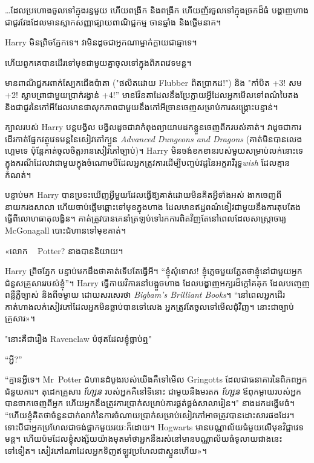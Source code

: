 …ដែលប្រហោងចូលទៅក្នុងរន្ធមួយ ហើយពង្រីក និងពង្រីក ហើយញ័រចូលទៅក្នុងច្រកដ៏ធំ បង្ហាញហាងជាជួរវែងដែលមានស្លាកសញ្ញាផ្សាយពាណិជ្ជកម្ម ចានឆ្នាំង និងថ្លើមនាគ។

Harry មិនព្រិចភ្នែកទេ។ វាមិនដូចជាអ្នកណាម្នាក់ក្លាយជាឆ្មាទេ។

ហើយពួកគេបានដើរទៅមុខជាមួយគ្នាចូលទៅក្នុងពិភពវេទមន្ត។

មានពាណិជ្ជករពាក់ស្បែកជើងប៉ាតា ("ផលិតដោយ Flubber ពិតប្រាកដ!") និង "កាំបិត +3! សម +2! ស្លាបព្រាជាមួយប្រាក់រង្វាន់ +4!” មានវ៉ែនតាដែលនឹងប្រែក្លាយអ្វីដែលអ្នកមើលទៅពណ៌បៃតង និងជាជួរនៃកៅអីដែលមានផាសុកភាពជាមួយនឹងកៅអីច្រានចេញសម្រាប់ការសង្គ្រោះបន្ទាន់។

ក្បាលរបស់ Harry បន្តបង្វិល បង្វិលដូចជាវាកំពុងព្យាយាមដកខ្លួនចេញពីករបស់គាត់។ វាដូចជាការដើរកាត់ផ្នែកវត្ថុវេទមន្តនៃសៀវភៅក្បួន \emph{Advanced Dungeons and Dragons} (គាត់មិនបានលេងហ្គេមទេ ប៉ុន្តែគាត់ចូលចិត្តអានសៀវភៅច្បាប់)។ Harry មិនចង់ខកខានរបស់មួយសម្រាប់លក់នោះទេ ក្នុងករណីដែលវាជាមួយក្នុងចំណោមបីដែលអ្នកត្រូវការដើម្បីបញ្ចប់វដ្តនៃអក្ខរាវិរុទ្ធ\emph{wish} ដែលគ្មានកំណត់។

បន្ទាប់មក Harry បានប្រទះឃើញអ្វីមួយដែលធ្វើឱ្យគាត់ដោយមិនគិតអ្វីទាំងអស់ ងាកចេញពីនាយករងសាលា ហើយចាប់ផ្តើមឆ្ពោះទៅមុខក្នុងហាង ដែលមានឥដ្ឋពណ៌ខៀវជាមួយនឹងការតុបតែងធ្វើពីលោហធាតុលង្ហិន។ គាត់​ត្រូវ​បាន​គេ​នាំ​ត្រឡប់​ទៅ​រក​ការ​ពិត​វិញ​តែ​នៅ​ពេល​ដែល​សាស្ត្រាចារ្យ McGonagall បោះ​ជំហាន​ទៅ​មុខ​គាត់។

«លោក ~ Potter? នាងបាននិយាយ។

Harry ព្រិចភ្នែក បន្ទាប់មកដឹងថាគាត់ទើបតែធ្វើអី។ “ខ្ញុំសុំទោស! ខ្ញុំភ្លេចមួយភ្លែតថាខ្ញុំនៅជាមួយអ្នកជំនួសគ្រួសាររបស់ខ្ញុំ”។ Harry ធ្វើកាយវិការនៅបង្អួចហាង ដែលបង្ហាញអក្សរដ៏ក្ដៅគគុក ដែលបញ្ចេញពន្លឺភ្លឺច្បាស់ និងពីចម្ងាយ ដោយសរសេរថា \emph{Bigbam's Brilliant Books}។ “នៅពេលអ្នកដើរកាត់ហាងលក់សៀវភៅដែលអ្នកមិនធ្លាប់បានទៅលេង អ្នកត្រូវតែចូលទៅមើលជុំវិញ។ នោះ​ជា​ច្បាប់​គ្រួសារ»។

"នោះគឺជារឿង Ravenclaw បំផុតដែលខ្ញុំធ្លាប់ឮ"

“អ្វី?”

“គ្មានអ្វីទេ។ Mr~Potter ជំហានដំបូងរបស់យើងគឺទៅមើល Gringotts ដែលជាធនាគារនៃពិភពអ្នកជំនួយការ។ តុដេកគ្រួសារ \emph{ហ្សែន} របស់អ្នកគឺនៅទីនោះ ជាមួយនឹងមរតក \emph{ហ្សែន} ឪពុកម្តាយរបស់អ្នកបានចាកចេញពីអ្នក ហើយអ្នកនឹងត្រូវការប្រាក់សម្រាប់ការផ្គត់ផ្គង់សាលារៀន។" នាងដកដង្ហើមធំ។ “ហើយ​ខ្ញុំ​គិត​ថា​ចំនួន​ជាក់លាក់​នៃ​ការ​ចំណាយ​ប្រាក់​សម្រាប់​សៀវភៅ​អាច​ត្រូវ​បាន​ដោះសារ​ផង​ដែរ។ ទោះបីជាអ្នកប្រហែលជាចង់ផ្អាកមួយរយៈក៏ដោយ។ Hogwarts មានបណ្ណាល័យធំមួយលើមុខវិជ្ជាវេទមន្ត។ ហើយប៉មដែលខ្ញុំសង្ស័យយ៉ាងមុតមាំថាអ្នកនឹងរស់នៅមានបណ្ណាល័យធំទូលាយជាងនេះទៅទៀត។ សៀវភៅ​ណា​ដែល​អ្នក​ទិញ​ឥឡូវ​ប្រហែល​ជា​ស្ទួន​ហើយ»។

